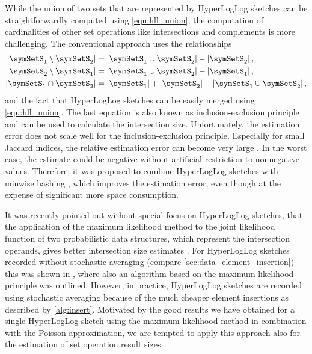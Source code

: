 \documentclass[a4paper]{scrartcl}
\begin{document}
While the union of two sets that are represented by HyperLogLog sketches can be straightforwardly computed using \eqref{equ:hll_union}, the computation of cardinalities of other set operations like intersections and complements is more challenging. The conventional approach uses the relationships
\begin{equation}
\label{equ:conventional_approach}
\begin{aligned}
\left\vert\symSetS_1 \setminus \symSetS_2\right\vert
&=
\left\vert\symSetS_1 \cup \symSetS_2\right\vert
-
\left\vert\symSetS_2\right\vert,
\\
\left\vert\symSetS_2 \setminus \symSetS_1\right\vert
&=
\left\vert\symSetS_1 \cup \symSetS_2\right\vert
-
\left\vert\symSetS_1\right\vert,
\\
\left\vert\symSetS_1 \cap \symSetS_2\right\vert
&=  
\left\vert\symSetS_1\right\vert  
+
\left\vert\symSetS_2\right\vert
-
\left\vert\symSetS_1 \cup \symSetS_2\right\vert,
\end{aligned}
\end{equation}
and the fact that HyperLogLog sketches can be easily merged using \eqref{equ:hll_union}. The last equation is also known as inclusion-exclusion principle and can be used to calculate the intersection size. Unfortunately, the estimation error does not scale well for the inclusion-exclusion principle. Especially for small Jaccard indices, the relative estimation error can become very large \cite{Dasgupta2015}. In the worst case, the estimate could be negative without artificial restriction to nonnegative values. Therefore, it was proposed to combine HyperLogLog sketches with minwise hashing \cite{Pascoe2013, Cohen2016}, which improves the estimation error, even though at the expense of significant more space consumption. 

It was recently pointed out without special focus on HyperLogLog sketches, that the application of the maximum likelihood method to the joint likelihood function of two probabilistic data structures, which represent the intersection operands, gives better intersection size estimates \cite{Ting2016}. For HyperLogLog sketches recorded without stochastic averaging (compare \cref{sec:data_element_insertion}) this was shown in \cite{Cohen2016}, where also an algorithm based on the maximum likelihood principle was outlined. However, in practice, HyperLogLog sketches are recorded using stochastic averaging because of the much cheaper element insertions as described by \cref{alg:insert}. Motivated by the good results we have obtained for a single HyperLogLog sketch using the maximum likelihood method in combination with the Poisson approximation, we are tempted to apply this approach also for the estimation of set operation result sizes.
\end{document}
